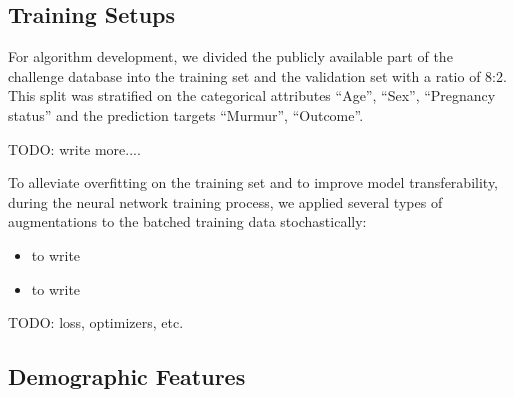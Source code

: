 \subsection{Training Setups}
\label{subsec:training}

For algorithm development, we divided the publicly available part of the challenge database into the training set and the validation set with a ratio of 8:2. This split was stratified on the categorical attributes ``Age'', ``Sex'', ``Pregnancy status'' and the prediction targets ``Murmur'', ``Outcome''.

TODO: write more....

To alleviate overfitting on the training set and to improve model transferability, during the neural network training process, we applied several types of augmentations to the batched training data stochastically:
\begin{itemize}
    \item to write
    \item to write
\end{itemize}

TODO: loss, optimizers, etc.

% 

\subsection{Demographic Features}
\label{subsec:demo_feat}

